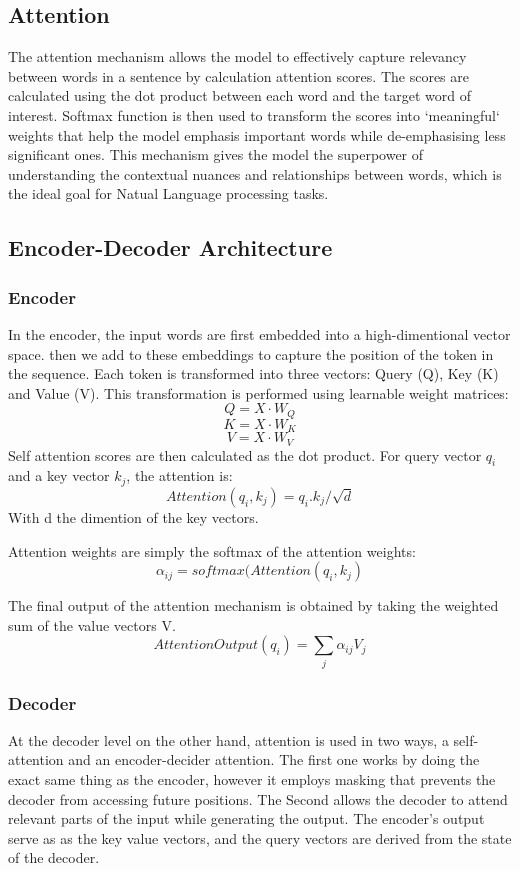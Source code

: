 \documentclass[a4paper,12pt,twoside]{report}
\begin{document}
\subsection{Attention}
The attention mechanism allows the model to effectively capture relevancy between words in a sentence by calculation attention scores. The scores are calculated using the dot product between each word and the target word of interest. Softmax function is then used to transform the scores into `meaningful` weights that help the model emphasis important words while de-emphasising less significant ones. This mechanism gives the model the superpower of understanding the contextual nuances and relationships between words, which is the ideal goal for Natual Language processing tasks.


\subsection{Encoder-Decoder Architecture}
\subsubsection{Encoder}
In the encoder, the input words are first embedded into a high-dimentional vector space. then we add to these embeddings to capture the position of the token in the sequence. Each token is transformed into three vectors: Query (Q), Key (K) and Value (V). This transformation is performed using learnable weight matrices:
$$Q = X \cdot W_{Q}$$
$$K = X \cdot W_{K}$$
$$V = X \cdot W_{V}$$
Self attention scores are then calculated as the dot product. For query vector $q_{i}$ and a key vector $k_{j}$, the attention is: 
$$Attention(q_{i},k_{j}) = q_{i} . k_{j} / \sqrt{d}$$ 
With d the dimention of the key vectors.

Attention weights are simply the softmax of the attention weights: $$\alpha_{ij} = softmax(Attention(q_{i},k_{j})$$

The final output of the attention mechanism is obtained by taking the weighted sum of the value vectors V.
$$AttentionOutput(q_{i}) = \sum_{j}\alpha_{ij} V_{j} $$
\subsubsection{Decoder}
At the decoder level on the other hand, attention is used in two ways, a self-attention and an encoder-decider attention. The first one works by doing the exact same thing as the encoder, however it employs masking that prevents the decoder from accessing future positions. The Second allows the decoder to attend relevant parts of the input while generating the output. The encoder's output serve as as the key value vectors, and the query vectors are derived from the state of the decoder.
\end{document}
